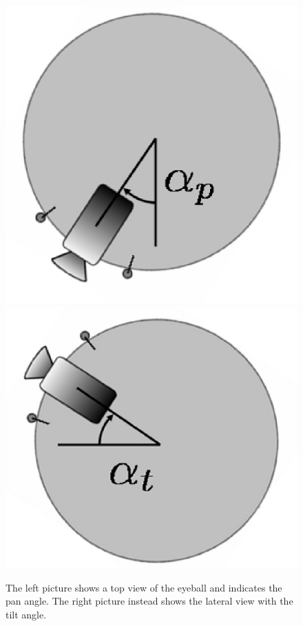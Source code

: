 \begin{figure}
  \begin{center}
  \includegraphics{Figure/EyePan.eps}
  \includegraphics{Figure/EyeTilt.eps}
  \end{center}
  \caption{The left picture shows a top view of the eyeball and indicates the pan angle. The right picture instead shows the lateral view with the tilt angle.}
  \label{Fig:EyePanTilt}
\end{figure}


